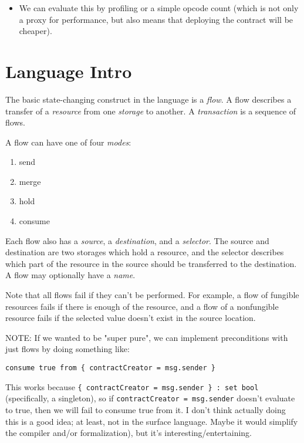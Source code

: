 \documentclass[10pt]{article}
\begin{document}
\begin{itemize}
        \begin{itemize}
            \item We can evaluate this by profiling or a simple opcode count (which is not only a proxy for performance, but also means that deploying the contract will be cheaper).
        \end{itemize}
\end{itemize}


\section{Language Intro}

The basic state-changing construct in the language is a \emph{flow}.
A flow describes a transfer of a \emph{resource} from one \emph{storage} to another.
A \emph{transaction} is a sequence of flows. 

A flow can have one of four \emph{modes}:
\begin{enumerate}
    \item send
    \item merge
    \item hold
    \item consume
\end{enumerate}

Each flow also has a \emph{source}, a \emph{destination}, and a \emph{selector}.
The source and destination are two storages which hold a resource, and the selector describes which part of the resource in the source should be transferred to the destination.
A flow may optionally have a \emph{name}.

Note that all flows fail if they can't be performed.
For example, a flow of fungible resources fails if there is enough of the resource, and a flow of a nonfungible resource fails if the selected value doesn't exist in the source location.

NOTE: If we wanted to be "super pure", we can implement preconditions with just flows by doing something like:
\begin{lstlisting}
consume true from { contractCreator = msg.sender }
\end{lstlisting}
This works because \lstinline|{ contractCreator = msg.sender } : set bool| (specifically, a singleton), so if \lstinline{contractCreator = msg.sender} doesn't evaluate to true, then we will fail to consume true from it.
I don't think actually doing this is a good idea; at least, not in the surface language.
Maybe it would simplify the compiler and/or formalization), but it's interesting/entertaining.
\end{document}
